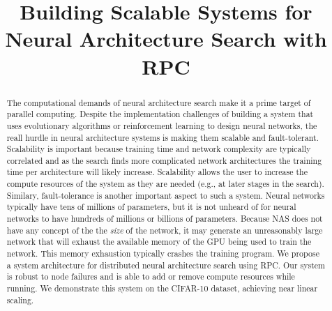 \documentclass[conference]{IEEEtran}
\begin{document}
\title{Building Scalable Systems for Neural Architecture Search with RPC}

\author{
\and
{}
}

\maketitle

\begin{abstract}
  The computational demands of neural architecture search make it a prime target
  of parallel computing. Despite the implementation challenges of building a
  system that uses evolutionary algorithms or reinforcement learning to design
  neural networks, the reall hurdle in neural architecture systems is making them
  scalable and fault-tolerant. Scalability is important because training time
  and network complexity are typically correlated and as the search finds more
  complicated network architectures the training time per architecture will
  likely increase. Scalability allows the user to increase the compute resources
  of the system as they are needed (e.g., at later stages in the search). Similary,
  fault-tolerance is another important aspect to such a system. Neural networks
  typically have tens of millions of parameters, but it is not unheard of for
  neural networks to have hundreds of millions or billions of parameters. Because
  NAS does not have any concept of the the \emph{size} of the network, it may
  generate an unreasonably large network that will exhaust the available memory
  of the GPU being used to train the network. This memory exhaustion typically
  crashes the training program.
  We propose a system architecture for distributed neural architecture search
  using RPC. Our system is robust to node failures and is able to add or remove
  compute resources while running. We demonstrate this system on the CIFAR-10
  dataset, achieving near linear scaling.
\end{abstract}
\end{document}
